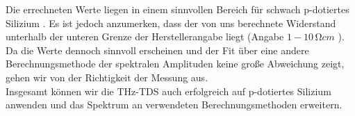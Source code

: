 Die errechneten Werte liegen in einem sinnvollen Bereich für schwach p-dotiertes Silizium \cite{EPC}.
Es ist jedoch anzumerken, dass der von uns berechnete Widerstand unterhalb der unteren Grenze der 
Herstellerangabe liegt (Angabe $1-10\,\si{\ohm cm}$ \cite{Anleitung}). Da die Werte dennoch sinnvoll 
erscheinen und der Fit über eine andere Berechnungsmethode der spektralen Amplituden keine große 
Abweichung zeigt, gehen wir von der Richtigkeit der Messung aus. \\
Insgesamt können wir die THz-TDS auch erfolgreich auf p-dotiertes Silizium anwenden und 
das Spektrum an verwendeten Berechnungsmethoden erweitern. \\